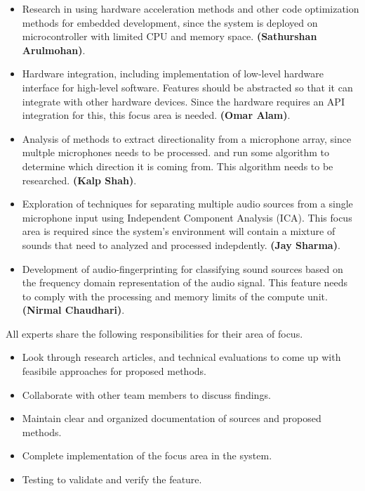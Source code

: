\documentclass[12pt]{article}
\theoremstyle{definition}
\begin{document}
\begin{itemize}
    \item Research in using hardware acceleration methods and other code 
    optimization methods for embedded development, since the system is
    deployed on microcontroller with limited CPU and memory space. 
    \textbf{(Sathurshan Arulmohan)}.
    \item Hardware integration, including implementation of low-level hardware
     interface for high-level software. 
    Features should be abstracted so that it can integrate with other hardware
     devices. Since the hardware requires an API integration
    for this, this focus area is needed. \textbf{(Omar Alam)}.
    \item Analysis of methods to extract directionality from a microphone array,
     since multple microphones needs to be processed.
    and run some algorithm to determine which direction it is coming from. This
     algorithm needs to be researched. \textbf{(Kalp Shah)}.
    \item Exploration of techniques for separating multiple audio sources from 
    a single microphone input using Independent Component Analysis (ICA).
    This focus area is required since the system's environment will contain a 
    mixture of sounds that need to analyzed and processed indepdently. 
    \textbf{(Jay Sharma)}.
    \item Development of audio-fingerprinting for classifying sound sources
    based on the frequency domain representation of the audio signal. This
    feature needs to comply with the processing and memory limits of the
    compute unit.\textbf{(Nirmal Chaudhari)}.
\end{itemize}

\noindent
All experts share the following responsibilities for their area of focus. 

\begin{itemize}
  \item Look through research articles, and technical evaluations to come up 
  with feasibile approaches for proposed methods. 
  \item Collaborate with other team members to discuss findings. 
  \item Maintain clear and organized documentation of sources and proposed 
  methods. 
  \item Complete implementation of the focus area in the system.
  \item Testing to validate and verify the feature.
\end{itemize}
\end{document}
